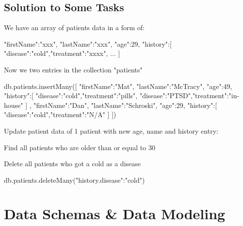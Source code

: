 \documentclass[12pt]{article}
\begin{document}
\subsection{Solution to Some Tasks}
We have an array of patients data in a form of:
\begin{code}
{
"firstName":"xxx",
"lastName":"xxx",
"age":29,
"history":[
{"disease":"cold","treatment":"xxxx"},
{...}
]
}
\end{code}
Now we two entries in the collection "patients"
\begin{code}
db.patients.insertMany([
{
"firstName":"Mat",
"lastName":"McTracy",
"age":49,
"history":[
{"disease":"cold","treatment":"pills"},
{"disease":"PTSD","treatment":"in-house"}
]
},
{
"firstName":"Dan",
"lastName":"Schroski",
"age":29,
"history":[
{"disease":"cold","treatment":"N/A"}
]
}
])
\end{code}
Update patient data of 1 patient with new age, name and history entry:
Find all patients who are older than or equal to 30
Delete all patients who got a cold as a disease
\begin{code}
db.patients.deleteMany({"history.disease":"cold"})
\end{code}
\newpage
\section{Data Schemas \& Data Modeling}
\end{document}
